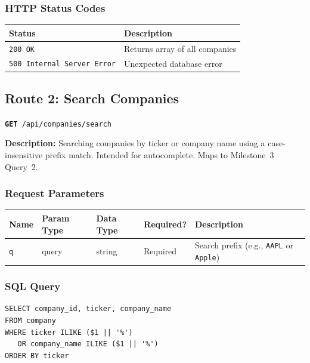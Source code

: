 \documentclass[11pt]{article}
\newcommand{\route}[2]{\texttt{\textcolor{routecolor}{\textbf{#1}}~#2}}
\begin{document}
\subsubsection*{HTTP Status Codes}

\begin{center}
\small
\begin{tabular}{l p{8cm}}
\toprule
\textbf{Status} & \textbf{Description} \\
\midrule
\texttt{200 OK} & Returns array of all companies \\
\texttt{500 Internal Server Error} & Unexpected database error \\
\bottomrule
\end{tabular}
\end{center}

\newpage
\subsection{Route 2: Search Companies}

\route{GET}{/api/companies/search}

\medskip\noindent
\textbf{Description:} Searching companies by ticker or company name using a case-insensitive prefix match. Intended for autocomplete. Maps to Milestone~3 Query~2.

\subsubsection*{Request Parameters}

\begin{center}
\small
\begin{tabular}{l l l l p{5cm}}
\toprule
\textbf{Name} & \textbf{Param Type} & \textbf{Data Type} & \textbf{Required?} & \textbf{Description} \\
\midrule
\texttt{q} & query & string & Required & Search prefix (e.g., \texttt{AAPL} or \texttt{Apple}) \\
\bottomrule
\end{tabular}
\end{center}

\subsubsection*{SQL Query}
\begin{lstlisting}[style=sql,basicstyle=\ttfamily\scriptsize]
SELECT company_id, ticker, company_name
FROM company
WHERE ticker ILIKE ($1 || '%')
   OR company_name ILIKE ($1 || '%')
ORDER BY ticker
\end{lstlisting}
\end{document}
